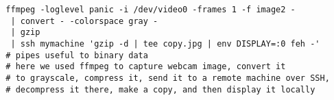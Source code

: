 \documentclass[letterpaper,12pt]{article}
\begin{document}
\begin{lstlisting}
  ffmpeg -loglevel panic -i /dev/video0 -frames 1 -f image2 -
   | convert - -colorspace gray -
   | gzip
   | ssh mymachine 'gzip -d | tee copy.jpg | env DISPLAY=:0 feh -'
  # pipes useful to binary data
  # here we used ffmpeg to capture webcam image, convert it
  # to grayscale, compress it, send it to a remote machine over SSH,
  # decompress it there, make a copy, and then display it locally
\end{lstlisting}
\end{document}
